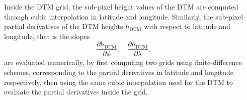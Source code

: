\documentclass[lineno, pdflatex,sn-mathphys-ay]{sn-jnl}
\theoremstyle{thmstyleone}%
\theoremstyle{thmstyletwo}%
\theoremstyle{thmstylethree}%
\begin{document}
Inside the DTM grid, the sub-pixel height values of the DTM are computed through
cubic %
interpolation in latitude and longitude.
%
Similarly, the sub-pixel partial derivatives of the DTM heights $h_{\mathrm{DTM}}$ with respect to latitude and longitude, that is the slopes
\begin{equation}
	\frac{\partial h_{\mathrm{DTM}}}{\partial \phi}, \quad
	\frac{\partial h_{\mathrm{DTM}}}{\partial \lambda}, \qquad 
\end{equation}
are evaluated numerically, by first computing two grids using finite-difference schemes, 
corresponding to the partial derivatives in latitude and longitude respectively, then using the same cubic interpolation used for the DTM to evaluate the partial derivatives inside the grid.




\end{document}
